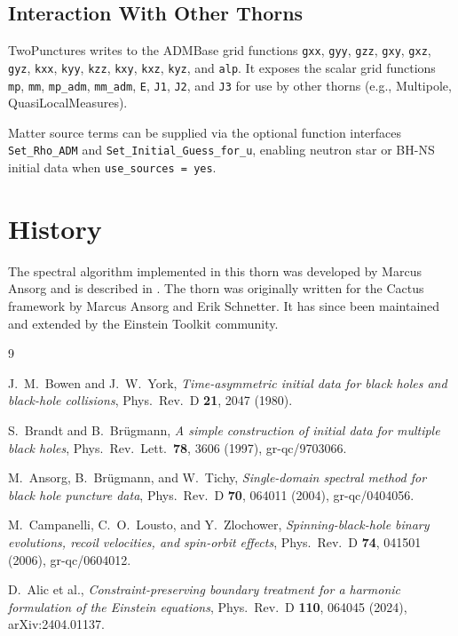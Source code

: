 \subsection{Interaction With Other Thorns}

TwoPunctures writes to the ADMBase grid functions \texttt{gxx}, \texttt{gyy},
\texttt{gzz}, \texttt{gxy}, \texttt{gxz}, \texttt{gyz}, \texttt{kxx},
\texttt{kyy}, \texttt{kzz}, \texttt{kxy}, \texttt{kxz}, \texttt{kyz}, and
\texttt{alp}.  It exposes the scalar grid functions \texttt{mp}, \texttt{mm},
\texttt{mp\_adm}, \texttt{mm\_adm}, \texttt{E}, \texttt{J1}, \texttt{J2},
and \texttt{J3} for use by other thorns (e.g., Multipole, QuasiLocalMeasures).

Matter source terms can be supplied via the optional function interfaces
\texttt{Set\_Rho\_ADM} and \texttt{Set\_Initial\_Guess\_for\_u}, enabling
neutron star or BH-NS initial data when \texttt{use\_sources = yes}.

\section{History}

The spectral algorithm implemented in this thorn was developed by Marcus
Ansorg and is described in \cite{einsteininitialdata_TwoPunctures_Ansorg04}.
The thorn was originally written for the Cactus framework by Marcus Ansorg
and Erik Schnetter.  It has since been maintained and extended by the Einstein
Toolkit community.

\begin{thebibliography}{9}

  J.~M.~Bowen and J.~W.~York,
  {\em Time-asymmetric initial data for black holes and black-hole collisions},
  Phys.\ Rev.\ D {\bf 21}, 2047 (1980).

  S.~Brandt and B.~Br\"ugmann,
  {\em A simple construction of initial data for multiple black holes},
  Phys.\ Rev.\ Lett.\ {\bf 78}, 3606 (1997),
  gr-qc/9703066.

  M.~Ansorg, B.~Br\"ugmann, and W.~Tichy,
  {\em Single-domain spectral method for black hole puncture data},
  Phys.\ Rev.\ D {\bf 70}, 064011 (2004),
  gr-qc/0404056.

  M.~Campanelli, C.~O.~Lousto, and Y.~Zlochower,
  {\em Spinning-black-hole binary evolutions, recoil velocities, and
  spin-orbit effects},
  Phys.\ Rev.\ D {\bf 74}, 041501 (2006),
  gr-qc/0604012.

  D.~Alic et al.,
  {\em Constraint-preserving boundary treatment for a harmonic formulation of
  the Einstein equations},
  Phys.\ Rev.\ D {\bf 110}, 064045 (2024),
  arXiv:2404.01137.

\end{thebibliography}


